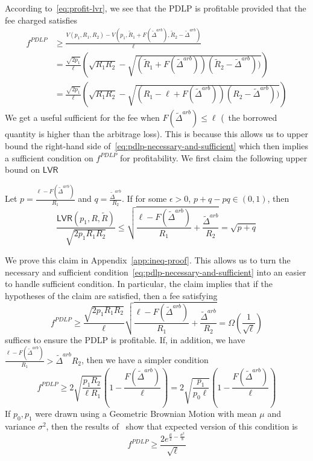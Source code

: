 According to~\eqref{eq:profit-lvr}, we see that the PDLP is profitable provided that the fee charged satisfies
\begin{align}
f^{PDLP} &\geq \frac{V(p_1, R_1, R_2) - V(p_1, \tilde{R}_1 + F(\tilde{\Delta}^{arb}), \tilde{R}_2 - \tilde{\Delta}^{arb})}{\ell} \nonumber \\
& = \frac{\sqrt{2p_1}}{\ell}\left(\sqrt{R_1 R_2} - \sqrt{(\tilde{R}_1 + F(\tilde{\Delta}^{arb}))(\tilde{R}_2 - \tilde{\Delta}^{arb}))}\right) \nonumber \\
&= \frac{\sqrt{2p_1}}{\ell}\left(\sqrt{R_1 R_2} - \sqrt{(R_1 - \ell + F(\tilde{\Delta}^{arb}))(R_2 - \tilde{\Delta}^{arb}))}\right) \label{eq:pdlp-necessary-and-sufficient}
\end{align}
We get a useful sufficient for the fee when $F(\tilde{\Delta}^{arb}) \leq \ell$ (\ie~the borrowed quantity is higher than the arbitrage loss).
This is because this allows us to upper bound the right-hand side of~\eqref{eq:pdlp-necessary-and-sufficient} which then implies a sufficient condition on $f^{PDLP}$ for profitability.
We first claim the following upper bound on $\mathsf{LVR}$
\begin{claim}\label{claim:ab-lb}
Let $p = \frac{\ell-F(\tilde{\Delta}^{arb})}{R_1}$ and $q = \frac{\tilde{\Delta}^{arb}}{R_2}$.
If for some $\epsilon > 0$, $p + q - pq \in (0, 1)$, then
\[
\frac{\mathsf{LVR}(p_1, R, \tilde{R})}{\sqrt{2p_1 R_1 R_2}} \leq 
 \sqrt{\frac{\ell-F(\tilde{\Delta}^{arb})}{R_1} + \frac{\tilde{\Delta}^{arb}}{R_2}} = \sqrt{p + q}
\]
\end{claim}
\noindent We prove this claim in Appendix~\ref{app:ineq-proof}.
This allows us to turn the necessary and sufficient condition~\eqref{eq:pdlp-necessary-and-sufficient} into an easier to handle sufficient condition.
In particular, the claim implies that if the hypotheses of the claim are satisfied, then a fee satisfying
\[
f^{PDLP} \geq \frac{\sqrt{2p_1 R_1 R_2}}{\ell} \sqrt{\frac{\ell-F(\tilde{\Delta}^{arb})}{R_1} + \frac{\tilde{\Delta}^{arb}}{R_2}} 
= \Omega\left(\frac{1}{\sqrt{\ell}}\right)
\]
suffices to ensure the PDLP is profitable.
If, in addition, we have $\frac{\ell-F(\tilde{\Delta}^{arb})}{R_1} > \tilde{\Delta}^{arb}{R_2}$, then we have a simpler condition
\[
f^{PDLP} \geq 2 \sqrt{\frac{p_1 R_2}{\ell R_1}}\left(1 - \frac{F(\tilde{\Delta}^{arb})}{\ell}\right) = 2 \sqrt{\frac{p_1}{p_0 \ell}}\left(1 - \frac{F(\tilde{\Delta}^{arb})}{\ell}\right)
\]
If $p_0, p_1$ were drawn using a Geometric Brownian Motion with mean $\mu$ and variance $\sigma^2$, then the results of~\cite[Appendix C]{angeris2021analysis} show that expected version of this condition is
\[
f^{PDLP} \geq \frac{2 e^{\frac{\mu}{2}-\frac{\sigma^2}{8}}}{\sqrt{\ell}}
\]


